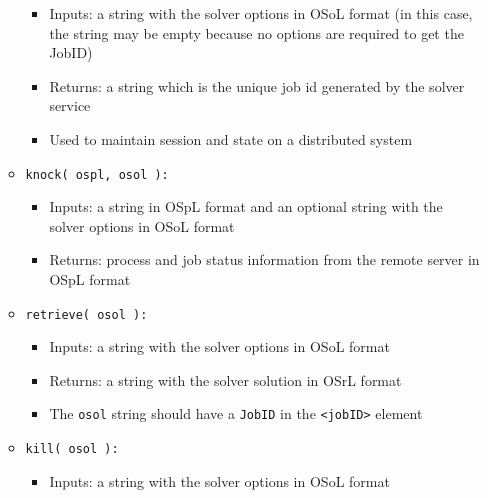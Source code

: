 \documentclass[11pt]{article}
\renewcommand{\_}{{\char"5F}}
\renewcommand{\{}{{\char"7B}}
\renewcommand{\}}{{\char"7D}}
\renewcommand{\^}{{\char"0D}}
\renewcommand{\'}{{\char"0D}}
\begin{document}
\begin{enumerate}[Step 1:]
\begin{itemize}
\begin{itemize}

\item Inputs: a string  with the solver options in OSoL format (in this case, the string
may be empty because no options are required to get the JobID)

\item Returns: a string which is the unique job id generated by the solver service

\item Used to maintain session and state on a distributed system
\end{itemize}



\item {\tt knock( ospl, osol ):}

\begin{itemize}

\item Inputs: a string in OSpL format and an optional string with the solver options in OSoL format

\item Returns: process and job status information from the remote server in OSpL format

\end{itemize}


\item {\tt retrieve( osol ):}

\begin{itemize}

\item Inputs: a string with the solver options  in OSoL format

\item Returns: a string with the solver solution in OSrL format

\item The {\tt osol} string should have a {\tt JobID} in the {\tt <jobID>} element

\end{itemize}


\item {\tt kill( osol ):}

\begin{itemize}

\item Inputs: a string with the solver options  in OSoL format


\end{itemize}
\end{itemize}
\end{enumerate}
\end{document}
